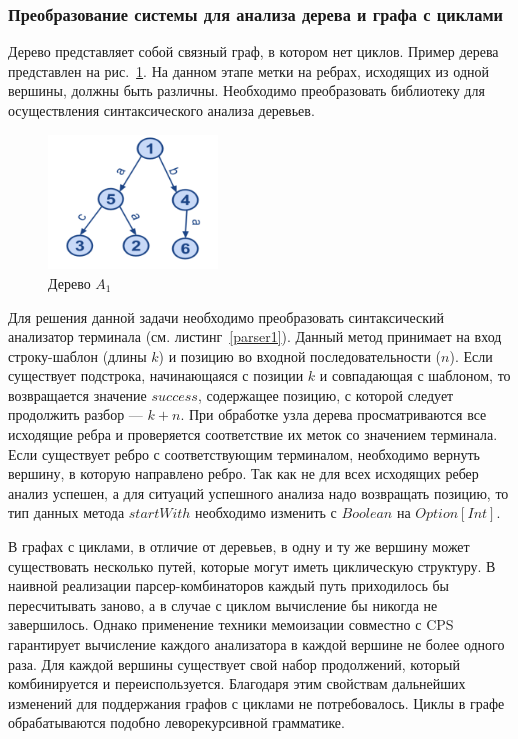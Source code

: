 \subsubsection{Преобразование системы для анализа дерева и графа с циклами}


Дерево представляет собой связный граф, в котором нет циклов. Пример дерева представлен на рис.~\ref{Graph1}. На данном этапе метки на ребрах, исходящих из одной вершины, должны быть различны. Необходимо преобразовать библиотеку для осуществления синтаксического анализа деревьев.

\begin{figure}

 \centering
 \includegraphics[width=0.4\textwidth]{Smolina/pics/Graph1.png}
 \caption{Дерево $A_1$}
 \label{Graph1}
\end{figure}

Для решения данной задачи необходимо преобразовать синтаксический анализатор терминала (см. листинг~\ref{parser1}). Данный метод принимает на вход строку-шаблон (длины $k$) и позицию во входной последовательности ($n$). Если существует подстрока, начинающаяся с позиции $k$ и совпадающая с шаблоном, то возвращается значение $success$, содержащее позицию, с которой следует продолжить разбор --- $k+n$. При обработке узла дерева просматриваются все исходящие ребра и проверяется соответствие их меток со значением терминала. Если существует ребро с соответствующим терминалом, необходимо вернуть вершину, в которую направлено ребро. Так как не для всех исходящих ребер анализ успешен, а для ситуаций успешного анализа надо возвращать позицию, то тип данных метода $startWith$ необходимо изменить с $Boolean$ на $Option[Int]$.

В графах с циклами, в отличие от деревьев, в одну и ту же вершину может существовать несколько путей, которые могут иметь циклическую структуру. В наивной реализации парсер-комбинаторов каждый путь приходилось бы пересчитывать заново, а в случае с циклом вычисление бы никогда не завершилось. Однако применение техники мемоизации совместно с CPS гарантирует вычисление каждого анализатора в каждой вершине не более одного раза. Для каждой вершины существует свой набор продолжений, который комбинируется и переиспользуется. Благодаря этим свойствам дальнейших изменений для поддержания графов с циклами не потребовалось. Циклы в графе обрабатываются подобно леворекурсивной грамматике.

